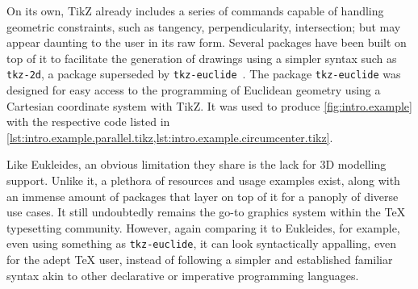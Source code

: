 On its own, \acs{TikZ} already includes a series of commands capable of handling
geometric constraints, such as tangency, perpendicularity, intersection; but may
appear daunting to the user in its raw form.  Several packages have been built
on top of it to facilitate the generation of drawings using a simpler syntax
such as \texttt{tkz-2d}, a package superseded by
\texttt{tkz-euclide}~\cite{Matthes:2011:tkz-euclide-manual}.  The package
\texttt{tkz-euclide} was designed for easy access to the programming of
Euclidean geometry using a Cartesian coordinate system with TikZ.  It was used
to produce \cref{fig:intro.example} with the respective code listed in
\cref{lst:intro.example.parallel.tikz,lst:intro.example.circumcenter.tikz}.

Like Eukleides, an obvious limitation they share is the lack for 3D modelling
support.  Unlike it, a plethora of resources and usage examples exist, along
with an immense amount of packages that layer on top of it for a panoply of
diverse use cases.  It still undoubtedly remains the go-to graphics system
within the \TeX{} typesetting community.  However, again comparing it to
Eukleides, for example, even using something as \texttt{tkz-euclide}, it can
look syntactically appalling, even for the adept \TeX{} user, instead of
following a simpler and established familiar syntax akin to other declarative or
imperative programming languages.
